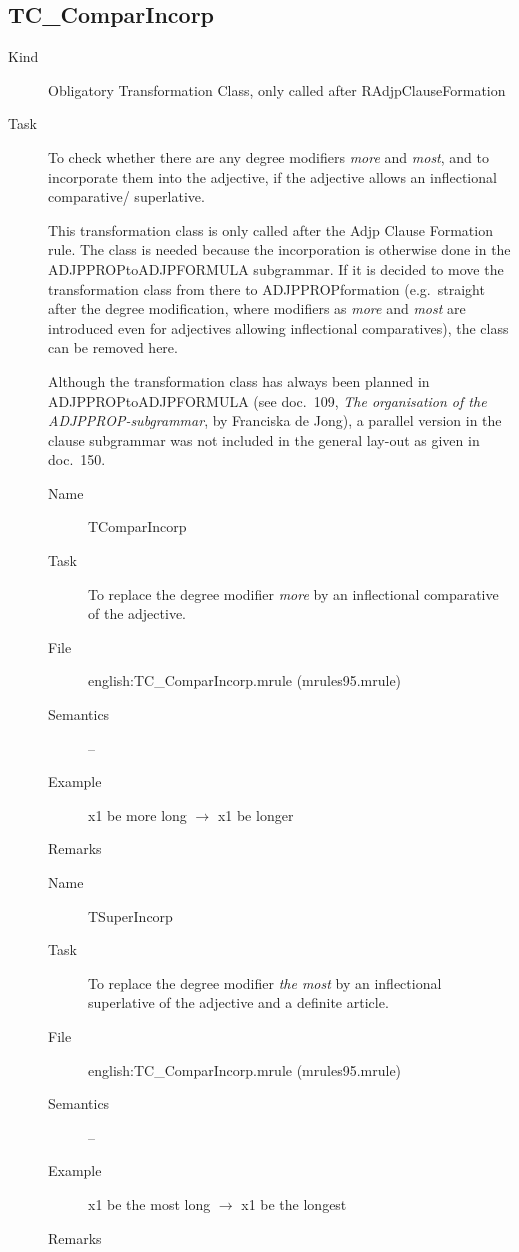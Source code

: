 \begin{description}
\end{description}

\newpage
\subsection{TC\_ComparIncorp}

\begin{description}
\item[Kind] Obligatory Transformation Class, only called after 
RAdjpClauseFormation
\item[Task] To check whether there are any degree modifiers {\em more\/} 
and {\em most\/}, and to incorporate them 
into the adjective, if the adjective allows an inflectional comparative/
superlative.

This transformation class is only called after the Adjp Clause Formation rule.
The class is needed because the incorporation is otherwise done in the 
ADJPPROPtoADJPFORMULA subgrammar. If it is decided to 
move the transformation class from there to ADJPPROPformation 
(e.g.\ straight after the 
degree modification, where modifiers as {\em more\/} and {\em most\/} are 
introduced even for adjectives allowing inflectional comparatives), the class 
can be removed here.

Although the transformation class has always been planned in 
ADJPPROPtoADJPFORMULA (see doc.\ 109, {\em The organisation of the 
ADJPPROP-sub\-gram\-mar\/}, by Franciska de Jong), a parallel version in the 
clause subgrammar was 
not included in the general lay-out as given in doc.\ 150.

\vspace{1 cm}
\begin{description}
\item[Name] TComparIncorp
\item[Task] To replace the degree modifier {\em more\/} by an inflectional 
comparative of the adjective.
\item[File] english:TC\_ComparIncorp.mrule (mrules95.mrule)
\item[Semantics] --
\item[Example] x1 be more long $\rightarrow$ x1 be longer
\item[Remarks] 
\end{description}

\vspace{1 cm}
\begin{description}
\item[Name] TSuperIncorp
\item[Task] To replace the degree modifier {\em the most\/} by an inflectional 
superlative of the adjective and a definite article.
\item[File] english:TC\_ComparIncorp.mrule (mrules95.mrule)
\item[Semantics] --
\item[Example] x1 be the most long $\rightarrow$ x1 be the longest
\item[Remarks] 
\end{description}



\end{description}
